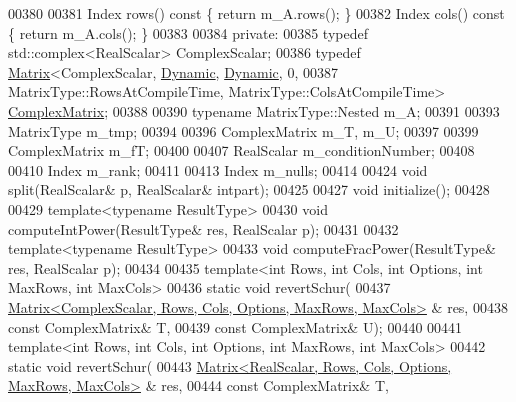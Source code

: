\begin{DoxyCode}
00380     
00381     Index rows()\textcolor{keyword}{ const }\{ \textcolor{keywordflow}{return} m\_A.rows(); \}
00382     Index cols()\textcolor{keyword}{ const }\{ \textcolor{keywordflow}{return} m\_A.cols(); \}
00383 
00384   \textcolor{keyword}{private}:
00385     \textcolor{keyword}{typedef} std::complex<RealScalar> ComplexScalar;
00386     \textcolor{keyword}{typedef} \hyperlink{group___core___module_class_eigen_1_1_matrix}{Matrix}<ComplexScalar, \hyperlink{namespace_eigen_ad81fa7195215a0ce30017dfac309f0b2}{Dynamic}, \hyperlink{namespace_eigen_ad81fa7195215a0ce30017dfac309f0b2}{Dynamic}, 0,
00387               MatrixType::RowsAtCompileTime, MatrixType::ColsAtCompileTime> 
      \hyperlink{group___core___module}{ComplexMatrix};
00388 
00390     \textcolor{keyword}{typename} MatrixType::Nested m\_A;
00391 
00393     MatrixType m\_tmp;
00394 
00396     ComplexMatrix m\_T, m\_U;
00397     
00399     ComplexMatrix m\_fT;
00400 
00407     RealScalar m\_conditionNumber;
00408 
00410     Index m\_rank;
00411     
00413     Index m\_nulls;
00414 
00424     \textcolor{keywordtype}{void} split(RealScalar& p, RealScalar& intpart);
00425 
00427     \textcolor{keywordtype}{void} initialize();
00428 
00429     \textcolor{keyword}{template}<\textcolor{keyword}{typename} ResultType>
00430     \textcolor{keywordtype}{void} computeIntPower(ResultType& res, RealScalar p);
00431 
00432     \textcolor{keyword}{template}<\textcolor{keyword}{typename} ResultType>
00433     \textcolor{keywordtype}{void} computeFracPower(ResultType& res, RealScalar p);
00434 
00435     \textcolor{keyword}{template}<\textcolor{keywordtype}{int} Rows, \textcolor{keywordtype}{int} Cols, \textcolor{keywordtype}{int} Options, \textcolor{keywordtype}{int} MaxRows, \textcolor{keywordtype}{int} MaxCols>
00436     \textcolor{keyword}{static} \textcolor{keywordtype}{void} revertSchur(
00437         \hyperlink{group___core___module_class_eigen_1_1_matrix}{Matrix<ComplexScalar, Rows, Cols, Options, MaxRows, MaxCols>}
      & res,
00438         \textcolor{keyword}{const} ComplexMatrix& T,
00439         \textcolor{keyword}{const} ComplexMatrix& U);
00440 
00441     \textcolor{keyword}{template}<\textcolor{keywordtype}{int} Rows, \textcolor{keywordtype}{int} Cols, \textcolor{keywordtype}{int} Options, \textcolor{keywordtype}{int} MaxRows, \textcolor{keywordtype}{int} MaxCols>
00442     \textcolor{keyword}{static} \textcolor{keywordtype}{void} revertSchur(
00443         \hyperlink{group___core___module_class_eigen_1_1_matrix}{Matrix<RealScalar, Rows, Cols, Options, MaxRows, MaxCols>}
      & res,
00444         \textcolor{keyword}{const} ComplexMatrix& T,

\end{DoxyCode}
